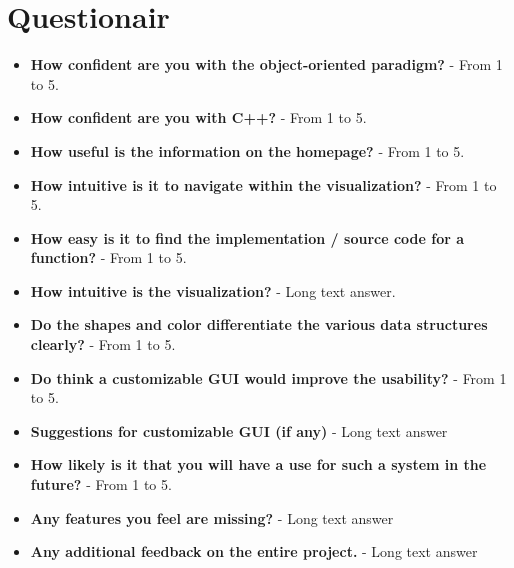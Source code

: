 \section*{Questionair}
\label{sec:questionair}
\begin{itemize}
    \item \textbf{How confident are you with the object-oriented paradigm?} - From 1 to 5.
    \item \textbf{How confident are you with C++?} - From 1 to 5.
    \item \textbf{How useful is the information on the homepage?} - From 1 to 5.
    \item \textbf{How intuitive is it to navigate within the visualization?} - From 1 to 5.
    \item \textbf{How easy is it to find the implementation / source code for a function?} - From 1 to 5.
    \item \textbf{How intuitive is the visualization?} - Long text answer.
    \item \textbf{Do the shapes and color differentiate the various data structures clearly?}  - From 1 to 5.
    \item \textbf{Do think a customizable GUI would improve the usability?} - From 1 to 5.
    \item \textbf{Suggestions for customizable GUI (if any)} - Long text answer
    \item \textbf{How likely is it that you will have a use for such a system in the future?} - From 1 to 5.
    \item \textbf{Any features you feel are missing?}  - Long text answer
    \item \textbf{Any additional feedback on the entire project.}  - Long text answer
\end{itemize}